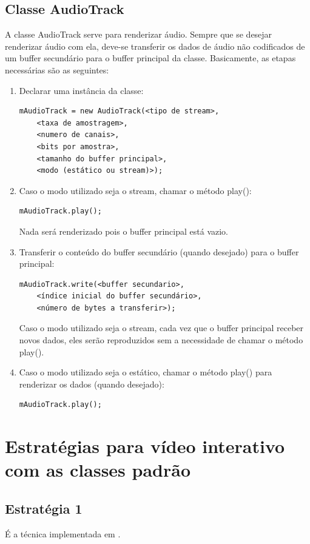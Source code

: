 \documentclass{acm_proc_article-sp}
\begin{document}
\subsection{Classe AudioTrack}
A classe AudioTrack serve para renderizar áudio. Sempre que se desejar renderizar áudio com ela, deve-se transferir os dados de áudio não codificados de um buffer secundário para o buffer principal da classe. Basicamente, as etapas necessárias são as seguintes:
\begin{enumerate}
 \item Declarar uma instância da classe:
  \begin{verbatim}
mAudioTrack = new AudioTrack(<tipo de stream>,
    <taxa de amostragem>,
    <numero de canais>,
    <bits por amostra>,
    <tamanho do buffer principal>,
    <modo (estático ou stream)>);
  \end{verbatim}
 \item Caso o modo utilizado seja o stream, chamar o método play():
  \begin{verbatim}
mAudioTrack.play();
  \end{verbatim}
  Nada será renderizado pois o buffer principal está vazio.
 \item Transferir o conteúdo do buffer secundário (quando desejado) para o buffer principal:
  \begin{verbatim}
mAudioTrack.write(<buffer secundario>,
    <índice inicial do buffer secundário>,
    <número de bytes a transferir>);
  \end{verbatim}
Caso o modo utilizado seja o stream, cada vez que o buffer principal receber novos dados, eles serão reproduzidos sem a necessidade de chamar o método play().
 \item Caso o modo utilizado seja o estático, chamar o método play() para renderizar os dados (quando desejado):
  \begin{verbatim}
mAudioTrack.play();
  \end{verbatim}
\end{enumerate}

\section{Estratégias para vídeo interativo com as classes padrão}

\subsection{Estratégia 1}
É a técnica implementada em \cite{trab_alemao}.
\end{document}

